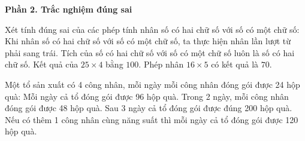\textbf{Phần 2. Trắc nghiệm đúng sai}

\begin{ex} %
Xét tính đúng sai của các phép tính nhân số có hai chữ số với số có một chữ số:
\choiceTF
{\True Khi nhân số có hai chữ số với số có một chữ số, ta thực hiện nhân lần lượt từ phải sang trái.}
{Tích của số có hai chữ số với số có một chữ số luôn là số có hai chữ số.}
{\True Kết quả của $25 \times 4$ bằng $100$.}
{Phép nhân $16 \times 5$ có kết quả là $70$.}
\end{ex}

\begin{ex} %
Một tổ sản xuất có 4 công nhân, mỗi ngày mỗi công nhân đóng gói được 24 hộp quà:
\choiceTF
{\True Mỗi ngày cả tổ đóng gói được 96 hộp quà.}
{\True Trong 2 ngày, mỗi công nhân đóng gói được 48 hộp quà.}
{Sau 3 ngày cả tổ đóng gói được đúng 200 hộp quà.}
{\True Nếu có thêm 1 công nhân cùng năng suất thì mỗi ngày cả tổ đóng gói được 120 hộp quà.}
\end{ex}

